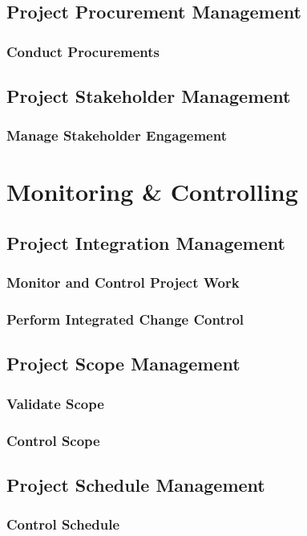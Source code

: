 \documentclass[12pt,letterpaper]{report}
\begin{document}
	\chapter{Project Procurement Management}
	\section{Conduct Procurements}
	\chapter{Project Stakeholder Management}
	\section{Manage Stakeholder Engagement}
	
	
	\part{Monitoring \& Controlling}
	\chapter{Project Integration Management}
	\section{Monitor and Control Project Work}
	\section{Perform Integrated Change Control}
	\chapter{Project Scope Management}
	\section{Validate Scope}
	\section{Control Scope}
	\chapter{Project Schedule Management}
	\section{Control Schedule}
\end{document}

